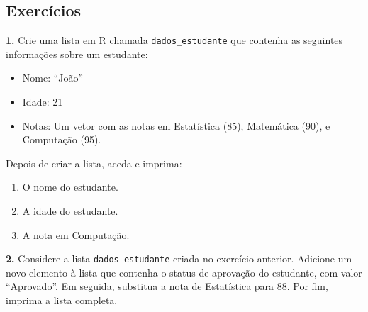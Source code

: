 \documentclass[
]{book}
\newenvironment{Shaded}{\begin{snugshade}}{\end{snugshade}}
\newcommand{\CommentTok}[1]{\textcolor[rgb]{0.56,0.35,0.01}{\textit{#1}}}
\newcommand{\ConstantTok}[1]{\textcolor[rgb]{0.56,0.35,0.01}{#1}}
\newcommand{\DecValTok}[1]{\textcolor[rgb]{0.00,0.00,0.81}{#1}}
\newcommand{\DocumentationTok}[1]{\textcolor[rgb]{0.56,0.35,0.01}{\textbf{\textit{#1}}}}
\newcommand{\FunctionTok}[1]{\textcolor[rgb]{0.13,0.29,0.53}{\textbf{#1}}}
\newcommand{\NormalTok}[1]{#1}
\newcommand{\OtherTok}[1]{\textcolor[rgb]{0.56,0.35,0.01}{#1}}
\newcommand{\SpecialCharTok}[1]{\textcolor[rgb]{0.81,0.36,0.00}{\textbf{#1}}}
\newcommand{\StringTok}[1]{\textcolor[rgb]{0.31,0.60,0.02}{#1}}
\providecommand{\tightlist}{%
  \setlength{\itemsep}{0pt}\setlength{\parskip}{0pt}}
\begin{document}
\begin{Shaded}
\end{Shaded}

\subsection{Exercícios}\label{exercuxedcios-5}

\textbf{1.} Crie uma lista em R chamada \texttt{dados\_estudante} que contenha as
seguintes informações sobre um estudante:

\begin{itemize}
\tightlist
\item
  Nome: ``João''
\item
  Idade: 21
\item
  Notas: Um vetor com as notas em Estatística (85), Matemática (90), e
  Computação (95).
\end{itemize}

Depois de criar a lista, aceda e imprima:

\begin{enumerate}
\def\labelenumi{\arabic{enumi}.}
\tightlist
\item
  O nome do estudante.
\item
  A idade do estudante.
\item
  A nota em Computação.
\end{enumerate}

\textbf{2.} Considere a lista \texttt{dados\_estudante} criada no exercício anterior.
Adicione um novo elemento à lista que contenha o status de aprovação do
estudante, com valor ``Aprovado''. Em seguida, substitua a nota de
Estatística para 88. Por fim, imprima a lista completa.
\end{document}
